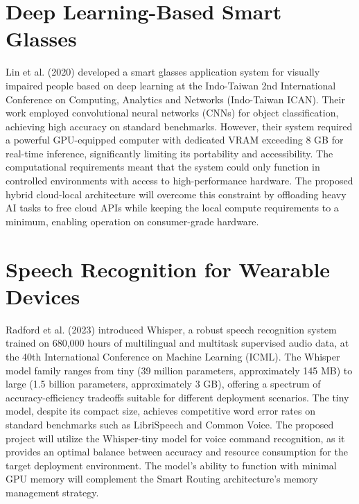 \section{Deep Learning-Based Smart Glasses}
Lin et al. (2020) developed a smart glasses application system for visually impaired people based on deep learning at the Indo-Taiwan 2nd International Conference on Computing, Analytics and Networks (Indo-Taiwan ICAN). Their work employed convolutional neural networks (CNNs) for object classification, achieving high accuracy on standard benchmarks. However, their system required a powerful GPU-equipped computer with dedicated VRAM exceeding 8 GB for real-time inference, significantly limiting its portability and accessibility. The computational requirements meant that the system could only function in controlled environments with access to high-performance hardware. The proposed hybrid cloud-local architecture will overcome this constraint by offloading heavy AI tasks to free cloud APIs while keeping the local compute requirements to a minimum, enabling operation on consumer-grade hardware.

\section{Speech Recognition for Wearable Devices}
Radford et al. (2023) introduced Whisper, a robust speech recognition system trained on 680,000 hours of multilingual and multitask supervised audio data, at the 40th International Conference on Machine Learning (ICML). The Whisper model family ranges from tiny (39 million parameters, approximately 145 MB) to large (1.5 billion parameters, approximately 3 GB), offering a spectrum of accuracy-efficiency tradeoffs suitable for different deployment scenarios. The tiny model, despite its compact size, achieves competitive word error rates on standard benchmarks such as LibriSpeech and Common Voice. The proposed project will utilize the Whisper-tiny model for voice command recognition, as it provides an optimal balance between accuracy and resource consumption for the target deployment environment. The model's ability to function with minimal GPU memory will complement the Smart Routing architecture's memory management strategy.

